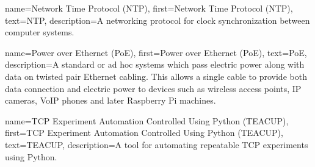 {
    name={Network Time Protocol (NTP)},
    first={Network Time Protocol (NTP)},
    text={NTP},
    description={A networking protocol for clock synchronization between computer systems.}
}

{
    name={Power over Ethernet (PoE)},
    first={Power over Ethernet (PoE)},
    text={PoE},
    description={A standard or ad hoc systems which pass electric power along with data on twisted pair Ethernet cabling. This allows a single cable to provide both data connection and electric power to devices such as wireless access points, IP cameras, VoIP phones and later Raspberry Pi machines.}
}

{
    name={TCP Experiment Automation Controlled Using Python (TEACUP)},
    first={TCP Experiment Automation Controlled Using Python (TEACUP)},
    text={TEACUP},
    description={A tool for automating repeatable TCP experiments using Python.}
}